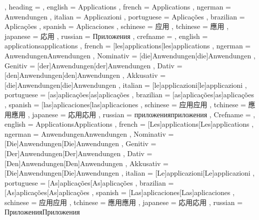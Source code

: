 
  {
    , heading =   {
                    , english     = Applications
                    , french      = Applications
                    , ngerman     = Anwendungen
                    , italian     = Applicazioni
                    , portuguese  = Aplicações
                    , brazilian   = Aplicações
                    , spanish     = Aplicaciones
                    , schinese    = 应用
                    , tchinese    = 應用
                    , japanese    = 応用
                    , russian     = Приложения
                  }
    , crefname =  {
                    , english     = {applications}{applications}
                    , french      = [les]{applications}[les]{applications}
                    , ngerman     = { {Anwendungen}{Anwendungen}
                                      , Nominativ = [die]{Anwendungen}[die]{Anwendungen}
                                      , Genitiv   = [der]{Anwendungen}[der]{Anwendungen}
                                      , Dativ     = [den]{Anwendungen}[den]{Anwendungen}
                                      , Akkusativ = [die]{Anwendungen}[die]{Anwendungen}
                                    }
                    , italian     = [le]{applicazioni}[le]{applicazioni}
                    , portuguese  = [as]{aplicações}[as]{aplicações}
                    , brazilian   = [as]{aplicações}[as]{aplicações}
                    , spanish     = [las]{aplicaciones}[las]{aplicaciones}
                    , schinese    = {应用}{应用}
                    , tchinese    = {應用}{應用}
                    , japanese    = {応用}{応用}
                    , russian     = {приложения}{приложения}
                  }
    , Crefname =  {
                    , english     = {Applications}{Applications}
                    , french      = [Les]{applications}[Les]{applications}
                    , ngerman     = { {Anwendungen}{Anwendungen}
                                      , Nominativ = [Die]{Anwendungen}[Die]{Anwendungen}
                                      , Genitiv   = [Der]{Anwendungen}[Der]{Anwendungen}
                                      , Dativ     = [Den]{Anwendungen}[Den]{Anwendungen}
                                      , Akkusativ = [Die]{Anwendungen}[Die]{Anwendungen}
                                    }
                    , italian     = [Le]{applicazioni}[Le]{applicazioni}
                    , portuguese  = [As]{aplicações}[As]{aplicações}
                    , brazilian   = [As]{aplicações}[As]{aplicações}
                    , spanish     = [Las]{aplicaciones}[Las]{aplicaciones}
                    , schinese    = {应用}{应用}
                    , tchinese    = {應用}{應用}
                    , japanese    = {応用}{応用}
                    , russian     = {Приложения}{Приложения}
                  }
  }

